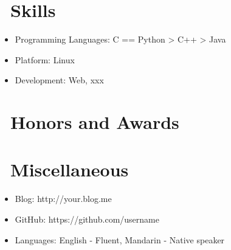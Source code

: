 \documentclass{resume}
\begin{document}

  \section{\faCogs\ Skills}
  \begin{itemize}[parsep=0.5ex]
    \item Programming Languages: C == Python > C++ > Java

    \item Platform: Linux

    \item Development: Web, xxx
  \end{itemize}

  \section{\faHeartO\ Honors and Awards}
   

  \section{\faInfo\ Miscellaneous}
  \begin{itemize}[parsep=0.5ex]
    \item Blog: http://your.blog.me

    \item GitHub: https://github.com/username

    \item Languages: English - Fluent, Mandarin - Native speaker
  \end{itemize}

\end{document}
